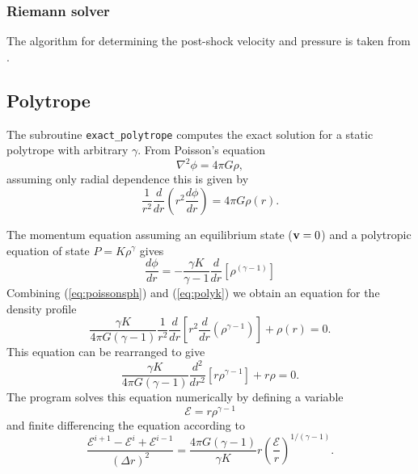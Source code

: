 \documentclass[a4paper,11pt]{article}
\begin{document}
\subsubsection{Riemann solver}
 The algorithm for determining the post-shock velocity and pressure is taken
from \citet{toro92}.

\subsection{Polytrope}
 The subroutine \verb+exact_polytrope+ computes the exact solution for a static polytrope with
arbitrary $\gamma$. From Poisson's equation
\begin{equation}
\nabla^2 \phi = 4\pi G \rho,
\end{equation}
assuming only radial dependence this is given by
\begin{equation}
\frac{1}{r^{2}} \frac{d}{dr} \left(r^{2} \frac{d\phi}{dr} \right) = 4\pi G \rho(r).
\label{eq:poissonsph}
\end{equation}
  
  The momentum equation assuming an equilibrium state (${\bf v} = 0$) and a
polytropic equation of state $P = K\rho^{\gamma}$ gives
\begin{equation}
\frac{d\phi}{dr} = - \frac{\gamma K}{\gamma-1}\frac{d}{dr} \left[\rho^{(\gamma -1)} \right]
\label{eq:polyk}
\end{equation}
Combining (\ref{eq:poissonsph}) and (\ref{eq:polyk}) we obtain an equation for the density profile
\begin{equation}
\frac{\gamma K}{4\pi G (\gamma - 1)} \frac{1}{r^{2}} \frac{d}{dr} \left[r^{2}
\frac{d}{dr}\left( \rho^{\gamma-1} \right) \right] + \rho(r) = 0.
\label{eq:dens}
\end{equation}
This equation can be rearranged to give
\begin{equation}
\frac{\gamma K}{4\pi G (\gamma - 1)} \frac{d^2}{dr^2}
\left[r\rho^{\gamma-1}\right] + r\rho = 0.
\end{equation}
 The program solves this equation numerically by defining a variable
\begin{equation}
\mathcal{E} = r \rho^{\gamma-1}
\end{equation}
and finite differencing the equation according to
\begin{equation}
\frac{\mathcal{E}^{i+1} - \mathcal{E}^i + \mathcal{E}^{i-1}}{(\Delta r)^2} =
\frac{4\pi G (\gamma - 1)}{\gamma K} r
\left(\frac{\mathcal{E}}{r}\right)^{1/(\gamma-1)}.
\end{equation}
\end{document}
